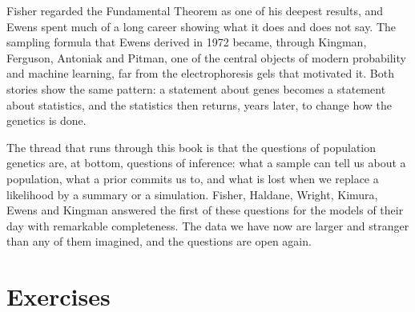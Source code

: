 Fisher regarded the Fundamental Theorem as one of his deepest results, and Ewens spent much of a
long career showing what it does and does not say. The sampling formula that Ewens derived in 1972
became, through Kingman, Ferguson, Antoniak and Pitman, one of the central objects of modern
probability and machine learning, far from the electrophoresis gels that motivated it. Both stories
show the same pattern: a statement about genes becomes a statement about statistics, and the
statistics then returns, years later, to change how the genetics is done.

The thread that runs through this book is that the questions of population genetics are, at bottom,
questions of inference: what a sample can tell us about a population, what a prior commits us to,
and what is lost when we replace a likelihood by a summary or a simulation. Fisher, Haldane, Wright,
Kimura, Ewens and Kingman answered the first of these questions for the models of their day with
remarkable completeness. The data we have now are larger and stranger than any of them imagined,
and the questions are open again.

\section{Exercises}

